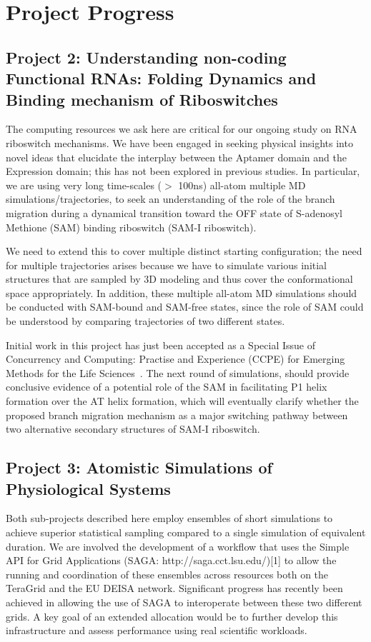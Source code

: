 \documentclass[a4paper,10pt]{article}
\begin{document}
\section{Project Progress}

\subsection{Project 2: Understanding non-coding Functional RNAs: 
Folding Dynamics and Binding mechanism of Riboswitches}

The computing resources we ask here are critical for our ongoing study
on RNA riboswitch mechanisms.  We have been engaged in seeking
physical insights into novel ideas that elucidate the interplay
between the Aptamer domain and the Expression domain; this has not
been explored in previous studies.  In particular, we are using very
long time-scales ($>$ 100ns) all-atom multiple MD
simulations/trajectories, to seek an understanding of the role of the
branch migration during a dynamical transition toward the OFF state of
S-adenosyl Methione (SAM) binding riboswitch (SAM-I riboswitch).

We need to extend this to cover multiple distinct starting
configuration; the need for multiple trajectories arises because we
have to simulate various initial structures that are sampled by 3D
modeling and thus cover the conformational space appropriately.  In
addition, these multiple all-atom MD simulations should be conducted
with SAM-bound and SAM-free states, since the role of SAM could be
understood by comparing trajectories of two different states.  

Initial work in this project has just been accepted as a Special Issue
of Concurrency and Computing: Practise and Experience (CCPE) for
Emerging Methods for the Life Sciences~\cite{ccpe10}.  The next round of
simulations, should provide conclusive evidence of a potential role of
the SAM in facilitating P1 helix formation over the AT helix
formation, which will eventually clarify whether the proposed branch
migration mechanism as a major switching pathway between two
alternative secondary structures of SAM-I riboswitch.

\subsection{Project 3: Atomistic Simulations of Physiological Systems}
Both sub-projects described here employ ensembles of short simulations to achieve superior
statistical sampling compared to a single simulation of equivalent duration. We are involved the development of a workflow that uses the Simple API for Grid Applications (SAGA: http://saga.cct.lsu.edu/)[1] to allow the running and coordination of these ensembles across resources both on the TeraGrid and the EU DEISA network. Significant progress has recently been achieved in allowing the use of SAGA to interoperate between these two different grids. A key goal of an extended allocation would be to further develop this infrastructure and assess performance using real scientific workloads.
\end{document}
